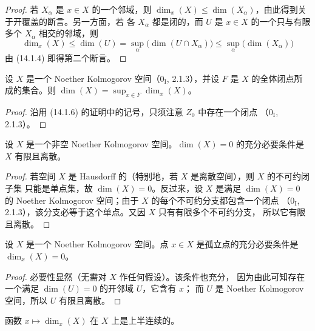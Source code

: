 \begin{proof}
若 $X_\alpha$ 是 $x\in X$ 的一个邻域，则
$\dim_x(X)\leq\dim(X_\alpha)$，由此得到关于开覆盖的断言。另一方面，若
各 $X_\alpha$ 都是闭的，而 $U$ 是 $x\in X$ 的一个只与有限多个 $X_\alpha$ 相交的邻域，则
\[
  \dim_x(X)\leq\dim(U)=\sup_\alpha\bigl(\dim(U\cap X_\alpha)\bigr)
  \leq\sup_\alpha\bigl(\dim(X_\alpha)\bigr)
\]
由 (14.1.4) 即得第二个断言。
\end{proof}

\begin{corollary}[14.1.8]
\label{0.14.1.8-fr}
设 $X$ 是一个 Noether Kolmogorov 空间（$0_{\mathrm I}$, 2.1.3），并设
$F$ 是 $X$ 的全体闭点所成的集合。则
$\dim(X)=\sup_{x\in F}\dim_x(X)$。
\end{corollary}

\begin{proof}
沿用 (14.1.6) 的证明中的记号，只须注意 $Z_0$ 中存在一个闭点
（$0_{\mathrm I}$, 2.1.3）。
\end{proof}

\begin{proposition}[14.1.9]
\label{0.14.1.9-fr}
设 $X$ 是一个非空 Noether Kolmogorov 空间。$\dim(X)=0$ 的充分必要条件是
$X$ 有限且离散。
\end{proposition}

\begin{proof}
若空间 $X$ 是 Hausdorff 的（特别地，若 $X$ 是离散空间），则 $X$ 的不可约闭子集
只能是单点集，故 $\dim(X)=0$。反过来，设 $X$ 是满足 $\dim(X)=0$ 的 Noether
Kolmogorov 空间；由于 $X$ 的每个不可约分支都包含一个闭点
（$0_{\mathrm I}$, 2.1.3），该分支必等于这个单点。又因 $X$ 只有有限多个不可约分支，
所以它有限且离散。
\end{proof}

\begin{corollary}[14.1.10]
\label{0.14.1.10-fr}
设 $X$ 是一个 Noether Kolmogorov 空间。点 $x\in X$ 是孤立点的充分必要条件是
$\dim_x(X)=0$。
\end{corollary}

\begin{proof}
必要性显然（无需对 $X$ 作任何假设）。该条件也充分，
因为由此可知存在一个满足 $\dim(U)=0$ 的开邻域 $U$，它含有 $x$；
而 $U$ 是 Noether Kolmogorov 空间，所以 $U$ 有限且离散。
\end{proof}

\begin{proposition}[14.1.11]
\label{0.14.1.11-fr}
函数 $x\mapsto\dim_x(X)$ 在 $X$ 上是上半连续的。
\end{proposition}

